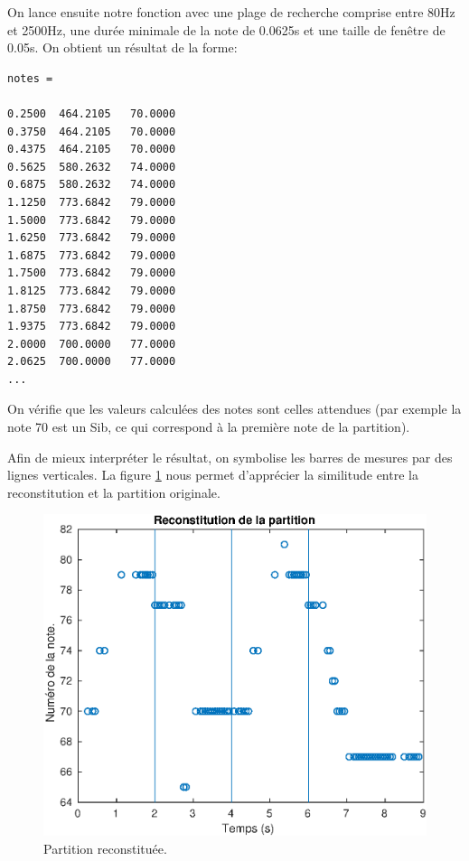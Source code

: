 \documentclass[french]{article}
\begin{document}
On lance ensuite notre fonction avec une plage de recherche comprise entre 80Hz et 2500Hz, une durée minimale de la note de 0.0625s et une taille de fenêtre de 0.05s. On obtient un résultat de la forme:

\begin{lstlisting}
notes =

0.2500  464.2105   70.0000
0.3750  464.2105   70.0000
0.4375  464.2105   70.0000
0.5625  580.2632   74.0000
0.6875  580.2632   74.0000
1.1250  773.6842   79.0000
1.5000  773.6842   79.0000
1.6250  773.6842   79.0000
1.6875  773.6842   79.0000
1.7500  773.6842   79.0000
1.8125  773.6842   79.0000
1.8750  773.6842   79.0000
1.9375  773.6842   79.0000
2.0000  700.0000   77.0000
2.0625  700.0000   77.0000
...
\end{lstlisting}

On vérifie que les valeurs calculées des notes sont celles attendues (par exemple la note 70 est un Sib, ce qui correspond à la première note de la partition).

Afin de mieux interpréter le résultat, on symbolise les barres de mesures par des lignes verticales. La figure \ref{fig:notes} nous permet d'apprécier la similitude entre la reconstitution et la partition originale.

\begin{figure}[h!]
	\centering
	\includegraphics[width=\textwidth]{images/notes.eps}
	\caption{Partition reconstituée.}
	\label{fig:notes}
\end{figure}
\end{document}
